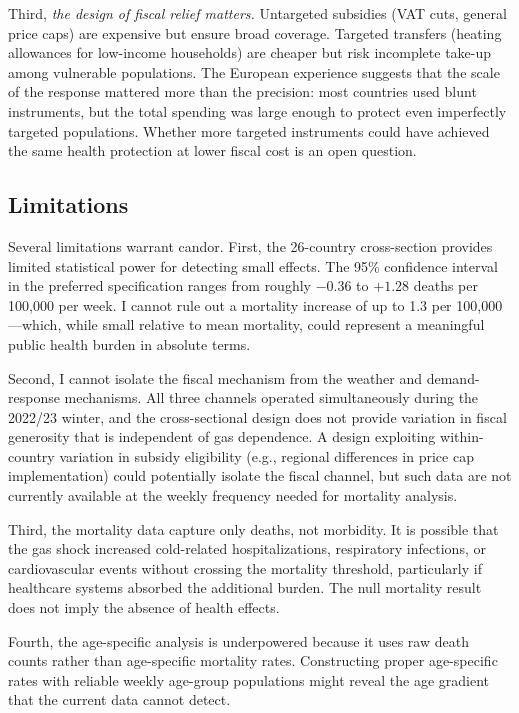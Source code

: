 \documentclass[12pt]{article}
\begin{document}
Third, \textit{the design of fiscal relief matters.} Untargeted subsidies (VAT cuts, general price caps) are expensive but ensure broad coverage. Targeted transfers (heating allowances for low-income households) are cheaper but risk incomplete take-up among vulnerable populations. The European experience suggests that the scale of the response mattered more than the precision: most countries used blunt instruments, but the total spending was large enough to protect even imperfectly targeted populations. Whether more targeted instruments could have achieved the same health protection at lower fiscal cost is an open question.

\subsection{Limitations}

Several limitations warrant candor. First, the 26-country cross-section provides limited statistical power for detecting small effects. The 95\% confidence interval in the preferred specification ranges from roughly $-0.36$ to $+1.28$ deaths per 100,000 per week. I cannot rule out a mortality increase of up to 1.3 per 100,000---which, while small relative to mean mortality, could represent a meaningful public health burden in absolute terms.

Second, I cannot isolate the fiscal mechanism from the weather and demand-response mechanisms. All three channels operated simultaneously during the 2022/23 winter, and the cross-sectional design does not provide variation in fiscal generosity that is independent of gas dependence. A design exploiting within-country variation in subsidy eligibility (e.g., regional differences in price cap implementation) could potentially isolate the fiscal channel, but such data are not currently available at the weekly frequency needed for mortality analysis.

Third, the mortality data capture only deaths, not morbidity. It is possible that the gas shock increased cold-related hospitalizations, respiratory infections, or cardiovascular events without crossing the mortality threshold, particularly if healthcare systems absorbed the additional burden. The null mortality result does not imply the absence of health effects.

Fourth, the age-specific analysis is underpowered because it uses raw death counts rather than age-specific mortality rates. Constructing proper age-specific rates with reliable weekly age-group populations might reveal the age gradient that the current data cannot detect.
\end{document}
